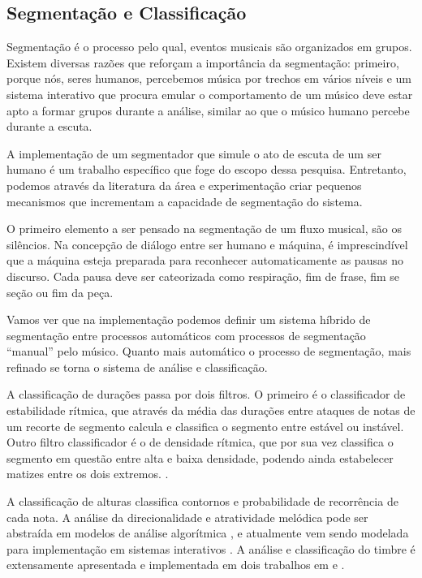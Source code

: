 \documentclass{ppgmus}
\begin{document}
\subsection{Segmentação e Classificação}


Segmentação é o processo pelo qual, eventos musicais são organizados
em grupos. Existem diversas razões que reforçam a importância da 
segmentação: primeiro, porque nós, seres humanos, percebemos música
por trechos em vários níveis e um sistema interativo que procura emular
o comportamento de um músico deve estar apto a formar grupos durante
a análise, similar ao que o músico humano percebe durante a escuta.

A implementação de um segmentador que simule o ato de escuta de um ser 
humano é um trabalho específico que foge do escopo dessa pesquisa. Entretanto,
podemos através da literatura da área e experimentação criar pequenos
mecanismos que incrementam a capacidade de segmentação do sistema.

O primeiro elemento a ser pensado na segmentação de um fluxo musical,
são os silêncios. Na concepção de diálogo entre ser humano e máquina,
é imprescindível que a máquina esteja preparada para reconhecer automaticamente
as pausas no discurso. Cada pausa deve ser cateorizada como respiração, fim de frase,
fim se seção ou fim da peça.

Vamos ver que na implementação podemos definir um sistema híbrido de segmentação
entre processos automáticos com processos de segmentação ``manual'' pelo músico.
Quanto mais automático o processo de segmentação, mais refinado se torna
o sistema de análise e classificação. 

A classificação de durações passa por dois filtros. O primeiro
é o classificador de estabilidade rítmica, que através da média das durações 
entre ataques de notas de um recorte de segmento calcula e classifica
o segmento entre estável ou instável.
Outro filtro classificador é o de densidade rítmica, que por sua vez classifica
o segmento em questão entre alta e baixa densidade, podendo ainda estabelecer
matizes entre os dois extremos. . 

A classificação de alturas classifica contornos e probabilidade de recorrência
de cada nota. A análise da direcionalidade e atratividade melódica pode ser abstraída
em modelos de análise algorítmica \cite{lerdahl2001}, e atualmente vem sendo modelada para 
implementação em sistemas interativos \cite{rickgrahan}.
A análise e classificação do timbre é extensamente apresentada e implementada em dois
trabalhos em \cite{brentcepstral} e \cite{monteiro}.
\end{document}
